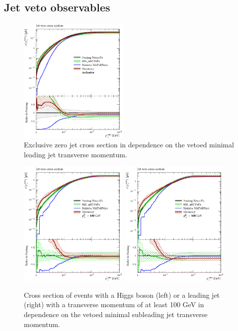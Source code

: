 \subsection{Jet veto observables}
\label{sec:hjetscomp:results:jvobs}

\begin{figure}[t!]
  \centering
  \includegraphics[width=0.47\textwidth]{figures/hjetscomp_xs_jet_veto_j0.pdf}
  \caption{
    Exclusive zero jet cross section in dependence on the vetoed minimal 
    leading jet transverse momentum.
    \label{fig:higgscomp:results:jvobs:jvxs0}
  }
\end{figure}


\begin{figure}[t!]
  \centering
  \includegraphics[width=0.47\textwidth]{figures/hjetscomp_xs_jet_veto_j1_100.pdf}
  \quad
  \includegraphics[width=0.47\textwidth]{figures/hjetscomp_xs_jet_veto_h_100.pdf}
  \caption{
    Cross section of events with a Higgs boson (left) or a leading jet (right)
    with a transverse momentum of at least 100 GeV in dependence on the 
    vetoed minimal subleading jet transverse momentum.
    \label{fig:higgscomp:results:1obs:jvxs1h_jvxs1j}
  }
\end{figure}

